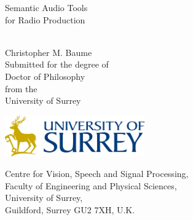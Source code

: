 \documentclass[11pt,a4paper]{report}
\begin{document}
\begin{titlepage}
  \vspace*{\fill}
  \begin{center}
    {\Huge Semantic Audio Tools\\for Radio Production\par}\\[1.5cm]
    {\Large Christopher M. Baume}\\[1cm]
    {\large Submitted for the degree of\\Doctor of Philosophy\\from the\\
      University of Surrey}\\[1cm]
    \begin{center}
      \includegraphics[width=6cm]{figs/surrey-logo.png}\\[1cm]
    \end{center}
    {\small Centre for Vision, Speech and Signal Processing,\\
      Faculty of Engineering and Physical Sciences,\\
      University of Surrey,\\
      Guildford, Surrey GU2 7XH, U.K.}
  \end{center}
  \vspace*{\fill}
\end{titlepage}





{\singlespacing
\tableofcontents
}

\listoffigures

\listoftables

















\begin{appendices}
  \renewcommand\chaptername{Appendix}
  
\end{appendices}

\printbibliography
\end{document}
